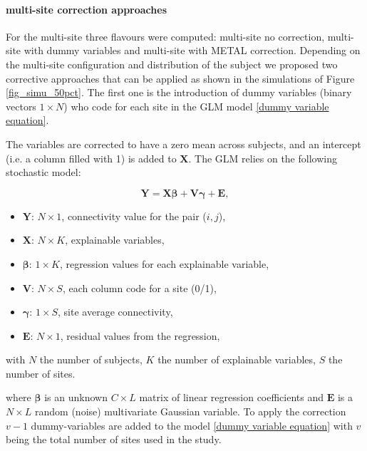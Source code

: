 \documentclass[authoryear]{elsarticle}
\begin{document}

\paragraph{multi-site correction approaches} 

For the multi-site three flavours were computed: multi-site no correction, multi-site with dummy variables and multi-site with METAL correction.
Depending on the multi-site configuration and distribution of the subject we proposed two corrective approaches that can be applied as shown in the simulations of Figure \ref{fig_simu_50pct}. The first one is the introduction of dummy variables (binary vectors $1\times N$) who code for each site in the GLM model \ref{dummy variable equation}.

The variables are corrected to have a zero mean across subjects, and an intercept (i.e. a column filled with 1) is added to $\mathbf{X}$. The GLM relies on the following stochastic model:

 \begin{equation}
 \label{eq_glm}
  \mathbf{Y} = \mathbf{X}\mathbf{\beta} + \mathbf{V}\mathbf{\gamma}+ \mathbf{E},
 \end{equation}
 \begin{itemize}
  \item $\mathbf{Y}$: $N\times 1$, connectivity value for the pair ($i,j$),
  \item $\mathbf{X}$: $N\times K$, explainable variables,
  \item $\mathbf{\beta}$: $1 \times K$, regression values for each explainable variable,
  \item $\mathbf{V}$: $N\times S$, each column code for a site (0/1),
  \item $\mathbf{\gamma}$: $1\times S$, site average connectivity,
  \item $\mathbf{E}$: $N\times 1$, residual values from the regression,
 \end{itemize}
with $N$ the number of subjects, $K$ the number of explainable variables, $S$ the number of sites.

where $\mathbf{\beta}$ is an unknown $C\times L$ matrix of linear regression coefficients and $\mathbf{E}$ is a $N\times L$ random (noise) multivariate Gaussian variable. %
To apply the correction $v-1$ dummy-variables are added to the model \ref{dummy variable equation} with $v$ being the total number of sites used in the study.
\end{document}
